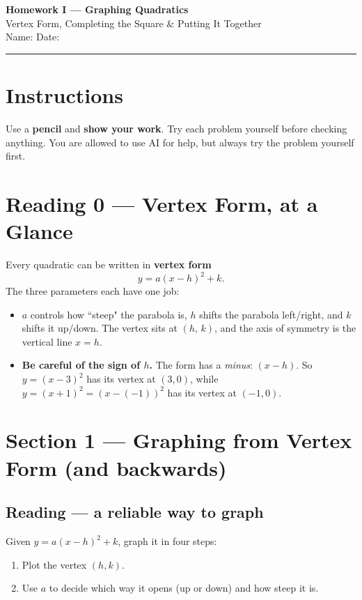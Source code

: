 \documentclass[12pt]{article}
\begin{document}
\pagestyle{fancy}
\begin{center}
  {\Large\bfseries Homework I --- Graphing Quadratics}\\[4pt]
  Vertex Form, Completing the Square \& Putting It Together\\[4pt]
  Name: \;\underline{\hspace{4cm}}\quad Date: \; \underline{\hspace{4cm}}
\end{center}
\hrule\bigskip
\section*{Instructions}
Use a \textbf{pencil} and \textbf{show your work}. Try each problem yourself before checking anything. You are allowed to use AI for help, but always try the problem yourself first.
\section*{Reading 0 --- Vertex Form, at a Glance}
Every quadratic can be written in \textbf{vertex form}
\[
  y = a(x-h)^2 + k .
\]
The three parameters each have one job:
\begin{itemize}
  \item $a$ controls how ``steep" the parabola is, $h$ shifts the parabola left/right, and $k$ shifts it up/down. The vertex sits at
        $(h,\,k)$, and the axis of symmetry is the vertical line $x = h$.
  \item \textbf{Be careful of the sign of $h$.} The form has a \emph{minus}: $(x-h)$. So $y=(x-3)^2$ has its vertex at
        $(3,0)$, while $y=(x+1)^2 = (x-(-1))^2$ has its vertex at $(-1,0)$.
\end{itemize}
\newpage
\section*{Section 1 --- Graphing from Vertex Form (and backwards)}
\subsection*{Reading --- a reliable way to graph}
Given $y=a(x-h)^2+k$, graph it in four steps:
\begin{enumerate}
  \item Plot the vertex $(h,k)$.
  \item Use $a$ to decide which way it opens (up or down) and how steep it is.
\end{enumerate}
\end{document}
